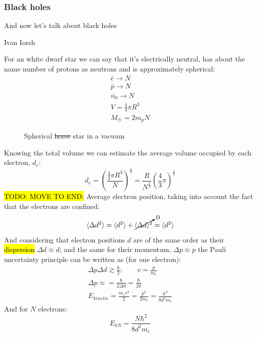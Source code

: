 		\subsubsection{Black holes}
			\epigraph{And now let's talk about black holes}{Ivan Iorsh}
			For an white dwarf star we can say that it's electrically neutral, has about the name number of protons as neutrons and is approximately spherical:
			\begin{align}
				\bar{e} \rightarrow N \\
				\bar{p} \rightarrow N \\
				\bar{n_0} \rightarrow N \\
				V = \frac{4}{3}\pi R^3 \\
				M_{\astrosun} = 2 m_p N
			\end{align}
			\begin{figure}[!h]
				\centering
				
				\caption{Spherical \sout{horse} star in a vacuum}
				\label{star}
			\end{figure}
			Knowing the total volume we can estimate the average volume occupied by each electron, $d_e$:
			\begin{equation}
				d_e = \left( \frac{\frac{4}{3}\pi R^3}{N} \right) ^{\frac{1}{3}} = \frac{R}{N^{\frac{1}{3}}}\left( \frac{4}{3}\pi \right)^{\frac{1}{3}}
			\end{equation}
			\hl{TODO: MOVE TO END:}
			Average electron position, taking into account the fact that the electrons are confined:
			\begin{equation}
				\langle \Delta d^2 \rangle = \langle d^2 \rangle + \cancelto{0}{\langle\Delta d \rangle^2} =  \langle d^2 \rangle
			\end{equation}
			And considering that electron positions $d$ are of the same order as their \hl{dispersion} $\Delta d \approx d$; and the same for their momentum, $\Delta p \approx p$ the Pauli uncertainty principle can be written as (for one electron):
			\begin{align}
				\Delta p \Delta d \gtrsim \frac{\hbar}{2}; \qquad v = \frac{p}{m_e} \\
				\Delta p \approx = \frac{\hbar}{2 \Delta d} = \frac{\hbar}{2 d} \\
				E_{kinetic} = \frac{m_ev^2}{2} = \frac{p^2}{2m_e} = \frac{\hbar^2}{8d^2m_e}
			\end{align}
			And for $N$ electrons:
			\begin{equation}
				E_{kN} = \frac{N\hbar^2}{8d^2m_e}
			\end{equation}
